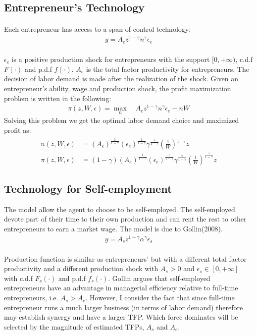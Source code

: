 \documentclass[12pt]{article}
\begin{document}
\bigskip
\subsection{Entrepreneur's Technology}
\paragraph{}
Each entrepreneur has access to a span-of-control technology:
\begin{align*}
y=A_e z^{1-\gamma}n^{\gamma}\epsilon_e
\end{align*}
\paragraph{}
$\epsilon_e$ is a positive production shock for entrepreneurs with the support $[0,+\infty)$, c.d.f $F(\cdot)$ and p.d.f $f(\cdot)$. $A_e$ is the total factor productivity for entrepreneurs. The decision of labor demand is made after the realization of the shock. Given an entrepreneur's ability, wage and production shock,  the profit maximization problem is written in the following:
\begin{align*}
\pi(z,W,\epsilon)=\max_n \quad A_e z^{1-\gamma}n^{\gamma}\epsilon_e-nW
\end{align*}
Solving this problem we get the optimal labor demand choice and maximized profit as:
\begin{align}
n(z,W,\epsilon)&=(A_e)^{\frac{1}{1-\gamma}}(\epsilon_e)^{\frac{1}{1-\gamma}} \gamma^{\frac{1}{1-\gamma}}(\frac{1}{W})^{\frac{1}{1-\gamma}}z\\
\pi(z,W,\epsilon)&=(1-\gamma)(A_e)^{\frac{1}{1-\gamma}}(\epsilon_e)^{\frac{1}{1-\gamma}}\gamma^{\frac{\gamma}{1-\gamma}}(\frac{1}{W})^{\frac{\gamma}{1-\gamma}}z
\end{align}


\bigskip


\subsection{Technology for Self-employment}
The model allow the agent to choose to be self-employed. The self-employed devote part of their time to their own production and can rent the rest to other entrepreneurs to earn a market wage. The model is due to Gollin(2008). 
\begin{align*}
y=A_s z^{1-\gamma}\alpha^{\gamma}\epsilon_s
\end{align*}
\paragraph{}
Production function is similar as entrepreneurs' but with a different total factor productivity and a different production shock with $A_s>0$ and $\epsilon_s \in[0,+\infty]$ with c.d.f $F_s(\cdot)$ and p.d.f $f_s(\cdot)$. Gollin argues that self-employed entrepreneurs have an advantage in managerial efficiency relative to full-time entrepreneurs, i.e. $A_s>A_e$. However, I consider the fact that since full-time entrepreneur runs a much larger business (in terms of labor demand) therefore may establish synergy and have a larger TFP. Which force dominates will be selected by the magnitude of estimated TFPs, $A_s$ and $A_e$.
\end{document}
